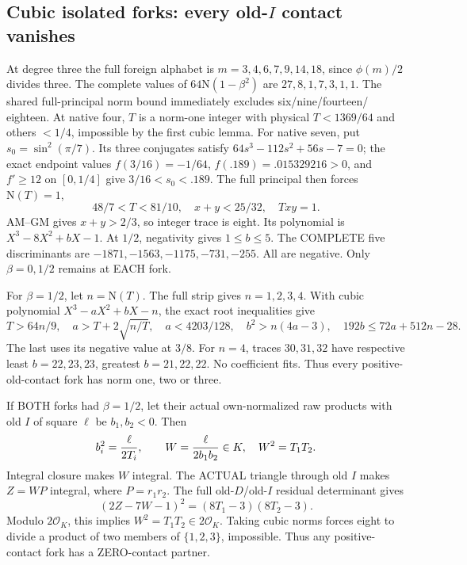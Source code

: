 \subsection{Cubic isolated forks: every old-\(I\) contact vanishes}
\label{app:arithD16Icubiccontacts}

At degree three the full foreign
alphabet is \(m=3,4,6,7,9,14,18\),
since \(\phi(m)/2\) divides three.
The complete values of
\(64\mathrm N(1-\beta^2)\) are
\(27,8,1,7,3,1,1\).
The shared full-principal norm bound
immediately excludes six/nine/fourteen/
eighteen.
At native four, \(T\) is a norm-one
integer with physical \(T<1369/64\)
and others \(<1/4\), impossible by
the first cubic lemma.
For native seven, put
\(s_0=\sin^2(\pi/7)\).
Its three conjugates satisfy
\(64s^3-112s^2+56s-7=0\);
the exact endpoint values
\(f(3/16)=-1/64\),
\(f(.189)=.015329216>0\),
and \(f'\ge12\) on \([0,1/4]\)
give \(3/16<s_0<.189\).
The full principal then forces
\(\mathrm N(T)=1\),
\[
                48/7<T<81/10,\quad
                x+y<25/32,\quad Txy=1 .
\]
AM--GM gives \(x+y>2/3\), so
integer trace is eight.
Its polynomial is \(X^3-8X^2+bX-1\).
At \(1/2\), negativity gives \(1\le b\le5\).
The COMPLETE five discriminants are
\(-1871,-1563,-1175,-731,-255\).
All are negative.
Only \(\beta=0,1/2\) remains at EACH fork.

For \(\beta=1/2\), let \(n=\mathrm N(T)\).
The full strip gives \(n=1,2,3,4\).
With cubic polynomial \(X^3-aX^2+bX-n\),
the exact root inequalities give
\[
 T>64n/9,\quad a>T+2\sqrt{n/T},\quad
 a<4203/128,\quad b^2>n(4a-3),\quad
                         192b\le72a+512n-28 .
\]
The last uses its negative value at
\(3/8\).
For \(n=4\), traces \(30,31,32\)
have respective least \(b=22,23,23\),
greatest \(b=21,22,22\).
No coefficient fits.
Thus every positive-old-contact fork
has norm one, two or three.

If BOTH forks had \(\beta=1/2\),
let their actual own-normalized raw
products with old \(I\) of square
\(\ell\) be \(b_1,b_2<0\).
Then
\[
 b_i^2={\ell\over2T_i},\qquad
 W={\ell\over2b_1b_2}\in K,\quad W^2=T_1T_2 .
\]
Integral closure makes \(W\) integral.
The ACTUAL triangle through old \(I\)
makes \(Z=WP\) integral, where
\(P=r_1r_2\).
The full old-\(D\)/old-\(I\) residual
determinant gives
\[
                         (2Z-7W-1)^2=(8T_1-3)(8T_2-3).
\]
Modulo \(2\mathcal O_K\), this implies
\(W^2=T_1T_2\in2\mathcal O_K\).
Taking cubic norms forces eight to
divide a product of two members of
\(\{1,2,3\}\), impossible.
Thus any positive-contact fork has
a ZERO-contact partner.

